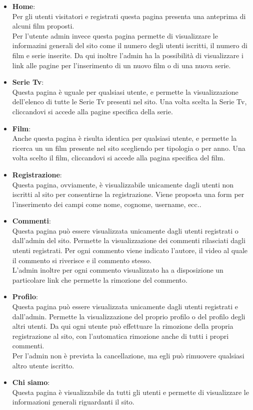 \begin{itemize}
\item \textbf{Home}:\\
Per gli utenti visitatori e registrati questa pagina presenta una anteprima di alcuni film proposti.\\
Per l'utente admin invece questa pagina permette di visualizzare le informazini generali del sito come il numero degli utenti iscritti, il numero di film e serie inserite. Da qui inoltre l'admin ha la possibilità di visualizzare i link alle pagine per l'inserimento di un nuovo film o di una nuova serie.
\item \textbf{Serie Tv}:\\
Questa pagina è uguale per qualsiasi utente, e permette la visualizzazione dell'elenco di tutte le Serie Tv presenti nel sito. Una volta scelta la Serie Tv, cliccandovi si accede alla pagine specifica della serie.
\item \textbf{Film}:\\
Anche questa pagina è risulta identica per qualsiasi utente, e permette la ricerca un un film presente nel sito scegliendo per tipologia o per anno. Una volta scelto il film, cliccandovi si accede alla pagina specifica del film.

\item \textbf{Registrazione}:\\
Questa pagina, ovviamente, è visualizzabile unicamente dagli utenti non iscritti al sito per consentirne la registrazione. Viene proposta una form per l'inserimento dei campi come nome, cognome, username, ecc..

\item \textbf{Commenti}:\\
Questa pagina può essere visualizzata unicamente dagli utenti registrati o dall'admin del sito. Permette la visualizzazione dei commenti rilasciati dagli utenti registrati. Per ogni commento viene indicato l'autore, il video al quale il commento si riverisce e il commento stesso.\\
L'admin inoltre per ogni commento visualizzato ha a disposizione un particolare link che permette la rimozione del commento.

\item \textbf{Profilo}:\\
Questa pagina può essere visualizzata unicamente dagli utenti registrati e dall'admin. Permette la visualizzazione del proprio profilo o del profilo degli altri utenti. Da qui ogni utente può effettuare la rimozione della propria registrazione al sito, con l'automatica rimozione anche di tutti i propri commenti.\\
\n Per l'admin non è prevista la cancellazione, ma egli può rimuovere qualsiasi altro utente iscritto.

\item \textbf{Chi siamo}:\\
Questa pagina è visualizzabile da tutti gli utenti e permette di visualizzare le informazioni generali riguardanti il sito.


\end{itemize}



